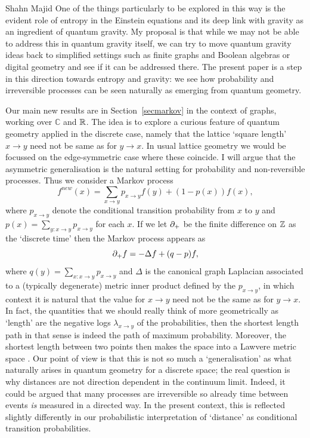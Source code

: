 \begin{artengenv}{Shahn Majid}
One of the things particularly to be explored in this way is the evident role of entropy in the Einstein equations and its deep link with gravity as an ingredient of quantum gravity. My proposal is that while we may not be able to address this in quantum gravity itself, we can try to move quantum gravity ideas back to simplified settings such as finite graphs \parencite{Ma:squ} and Boolean algebras or digital geometry \parencite{MaPac2,Ma:boo} and see if it can be addressed there. The present paper is a step in this direction towards entropy and gravity: we see how probability and irreversible processes can be seen naturally as emerging from quantum geometry. 

Our main new results are in Section~\ref{secmarkov} in the context of graphs, working over $\mathbb{C}$ and ${\mathbb{R}}$. The idea is to explore a curious feature of quantum geometry applied in the discrete case, namely that the lattice `square length' $x\to y$ need not be same as for $y\to x$. In usual lattice geometry we would be focussed on the edge-symmetric case where these coincide. I will argue that the asymmetric generalisation is the natural setting for probability and non-reversible processes. Thus we consider a Markov process 
\[ f^{new}(x)=\sum_{x\to y} p_{x\to y} f(y)+ (1-p(x))f(x),\]
where $p_{x\to y}$ denote the conditional transition probability from $x$ to $y$ and $p(x)=\sum_{y: x\to y} p_{x\to y}$ for each $x$. If we let ${\partial}_+$ be the finite difference on ${\mathbb{Z}}$ as the `discrete time' then the Markov process appears as 
\[ {\partial}_+ f= -\Delta f + (q-p)f, \]
where $q(y)=\sum_{x:x\to y}p_{x\to y}$ and $\Delta$ is the canonical graph Laplacian associated to a (typically degenerate) metric inner product defined by the $p_{x\to y}$, in which context it is natural that the value for $x\to y$ need not be the same as for $y\to x$. In fact, the quantities that we should really think of more geometrically as `length' are the negative logs $\lambda_{x\to y}$ of the probabilities, then the shortest length path in that sense is indeed the path of maximum probability. Moreover, the shortest length between two points then makes the space into a Lawvere metric space \parencite{ApCat}. Our point of view is that this is not so much a `generalisation' as what naturally arises in quantum geometry for a discrete space; the real question is why distances are not direction dependent in the continuum limit. Indeed, it could be argued that many processes are
irreversible so already time between events {\em is} measured in a directed way. In the present context, this is reflected slightly differently in our probabilistic interpretation of `distance' as conditional transition probabilities. 


\end{artengenv}
